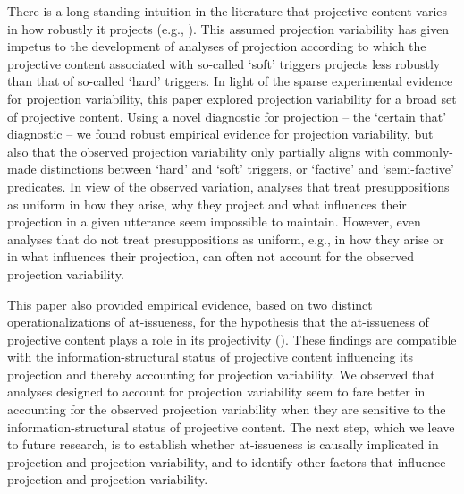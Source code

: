 \documentclass[11pt,fleqn]{article}
\newcommand{\6}{\mbox{$[\hspace*{-.6mm}[$}}
\newcommand{\9}{\mbox{$]\hspace*{-.6mm}]$}}
\begin{document}
There is a long-standing intuition in the literature that projective content varies in how robustly it projects (e.g., \citealt{karttunen71b,simons01,abusch10}). This assumed projection variability has given impetus to the development of analyses of projection according to which the projective content associated with so-called `soft' triggers projects less robustly than that of so-called `hard' triggers. In light of the sparse experimental evidence for projection variability, this paper explored projection variability for a broad set of projective content. Using a novel diagnostic for projection -- the `certain that' diagnostic -- we found robust empirical evidence for projection variability, but also that the observed projection variability only partially aligns with commonly-made distinctions between `hard' and `soft' triggers, or `factive' and `semi-factive' predicates. In view of the observed variation, analyses that treat presuppositions as uniform in how they arise, why they project and what influences their projection in a given utterance seem impossible to maintain. However, even analyses that do not treat presuppositions as uniform, e.g., in how they arise or in what influences their projection, can often not account for the observed projection variability. 

This paper also provided empirical evidence, based on two distinct operationalizations of at-issueness, for the hypothesis that the at-issueness of projective content plays a role in its projectivity (\citealt{brst-salt10,brst-ar}). These findings are compatible with the information-structural status of projective content influencing its projection and thereby accounting for projection variability. We observed that analyses designed to account for projection variability seem to fare better in accounting for the observed projection variability when they are sensitive to the information-structural status of projective content. The next step, which we leave to future research, is to establish whether at-issueness is causally implicated in projection and projection variability, and to identify other factors that influence projection and projection variability.

\appendix

\setcounter{table}{0}
\renewcommand{\thetable}{A\arabic{table}}
\end{document}
